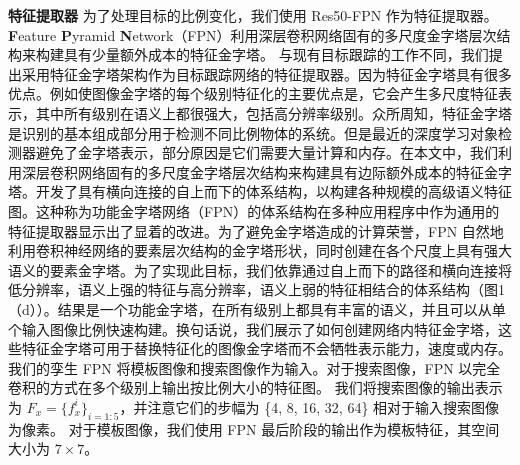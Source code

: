 \textbf{特征提取器} 为了处理目标的比例变化，我们使用 Res50-FPN \cite{lin2017feature} 作为特征提取器。
\textbf{F}eature \textbf{P}yramid \textbf{N}etwork（FPN）利用深层卷积网络固有的多尺度金字塔层次结构来构建具有少量额外成本的特征金字塔。
与现有目标跟踪的工作不同，我们提出采用特征金字塔架构作为目标跟踪网络的特征提取器。因为特征金字塔具有很多优点。例如使图像金字塔的每个级别特征化的主要优点是，它会产生多尺度特征表示，其中所有级别在语义上都很强大，包括高分辨率级别。众所周知，特征金字塔是识别的基本组成部分用于检测不同比例物体的系统。但是最近的深度学习对象检测器避免了金字塔表示，部分原因是它们需要大量计算和内存。在本文中，我们利用深层卷积网络固有的多尺度金字塔层次结构来构建具有边际额外成本的特征金字塔。开发了具有横向连接的自上而下的体系结构，以构建各种规模的高级语义特征图。这种称为功能金字塔网络（FPN）的体系结构在多种应用程序中作为通用的特征提取器显示出了显着的改进。为了避免金字塔造成的计算荣誉，FPN 自然地利用卷积神经网络的要素层次结构的金字塔形状，同时创建在各个尺度上具有强大语义的要素金字塔。为了实现此目标，我们依靠通过自上而下的路径和横向连接将低分辨率，语义上强的特征与高分辨率，语义上弱的特征相结合的体系结构（图1（d））。结果是一个功能金字塔，在所有级别上都具有丰富的语义，并且可以从单个输入图像比例快速构建。换句话说，我们展示了如何创建网络内特征金字塔，这些特征金字塔可用于替换特征化的图像金字塔而不会牺牲表示能力，速度或内存。%
我们的孪生 FPN 将模板图像和搜索图像作为输入。对于搜索图像，FPN 以完全卷积的方式在多个级别上输出按比例大小的特征图。
我们将搜索图像的输出表示为 $F_{x} = \{f_{x}^i\}_{i=1:5}$，并注意它们的步幅为 \{4, 8, 16, 32, 64\} 相对于输入搜索图像为像素。
对于模板图像，我们使用 FPN 最后阶段的输出作为模板特征，其空间大小为 $7 \times 7$。

